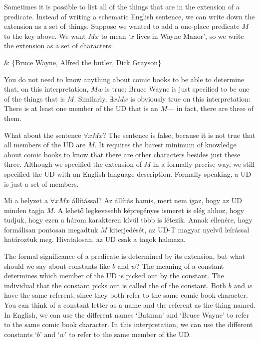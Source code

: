 Sometimes it is possible to list all of the things that are in the extension of a predicate. Instead of writing a schematic English sentence, we can write down the extension as a set of things. Suppose we wanted to add a one-place predicate $M$ to the key above. We want $Mx$ to mean `$x$ lives in Wayne Manor', so we write the extension as a set of characters:
\begin{partialmodel}
	 & \{Bruce Wayne, Alfred the butler, Dick Grayson\}
\end{partialmodel}
You do not need to know anything about comic books to be able to determine that, on this interpretation, $Mw$ is true: Bruce Wayne is just specified to be one of the things that is $M$. Similarly, $\exists x Mx$ is obviously true on this interpretation: There is at least one member of the UD that is an $M$--- in fact, there are three of them.



What about the sentence $\forall x  Mx$? The sentence is false, because it is not true that all members of the UD are $M$. It requires the barest minimum of knowledge about comic books to know that there are other characters besides just these three. Although we specified the extension of $M$ in a formally precise way, we still specified the UD with an English language description. Formally speaking, a UD is just a set of members.

Mi a helyzet a $\forall x  Mx$ állítással? Az állítás hamis, mert nem igaz, hogy az UD minden tagja $M$. A lehető legkevesebb képregényes ismeret is elég ahhoz, hogy tudjuk, hogy ezen a három karakteren kívül több is létezik. Annak ellenére, hogy formálisan pontosan megadtuk $M$ kiterjedését, az UD-T magyar nyelvű leírással határoztuk meg. Hivatalosan, az UD csak a tagok halmaza.

The formal significance of a predicate is determined by its extension, but what should we say about constants like $b$ and $w$? The meaning of a constant determines which member of the UD is picked out by the constant. The individual that the constant picks out is called the  of the constant. Both $b$ and $w$ have the same referent, since they both refer to the same comic book character. You can think of a constant letter as a name and the referent as the thing named. In English, we can use the different names `Batman' and `Bruce Wayne' to refer to the same comic book character. In this interpretation, we can use the different constants `$b$' and `$w$' to refer to the same member of the UD.

